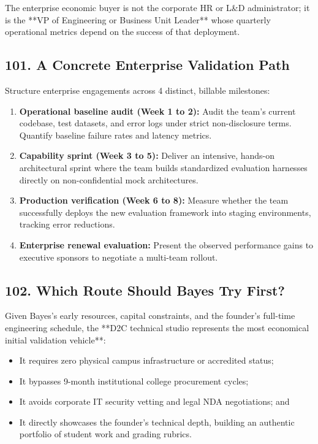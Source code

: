The enterprise economic buyer is not the corporate HR or L\&D administrator; it is the **VP of Engineering or Business Unit Leader** whose quarterly operational metrics depend on the success of that deployment.

\subsection*{101. A Concrete Enterprise Validation Path}

Structure enterprise engagements across 4 distinct, billable milestones:

\begin{enumerate}
    \item \textbf{Operational baseline audit (Week 1 to 2):} Audit the team's current codebase, test datasets, and error logs under strict non-disclosure terms. Quantify baseline failure rates and latency metrics.
    \item \textbf{Capability sprint (Week 3 to 5):} Deliver an intensive, hands-on architectural sprint where the team builds standardized evaluation harnesses directly on non-confidential mock architectures.
    \item \textbf{Production verification (Week 6 to 8):} Measure whether the team successfully deploys the new evaluation framework into staging environments, tracking error reductions.
    \item \textbf{Enterprise renewal evaluation:} Present the observed performance gains to executive sponsors to negotiate a multi-team rollout.
\end{enumerate}

\subsection*{102. Which Route Should Bayes Try First?}

Given Bayes's early resources, capital constraints, and the founder's full-time engineering schedule, the **D2C technical studio represents the most economical initial validation vehicle**:
\begin{itemize}
    \item It requires zero physical campus infrastructure or accredited status;
    \item It bypasses 9-month institutional college procurement cycles;
    \item It avoids corporate IT security vetting and legal NDA negotiations; and
    \item It directly showcases the founder's technical depth, building an authentic portfolio of student work and grading rubrics.
\end{itemize}

